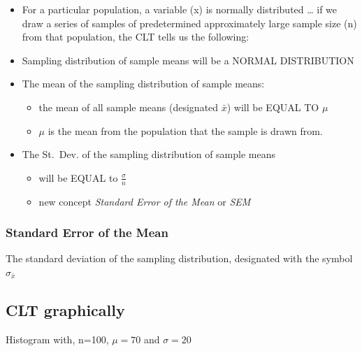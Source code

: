 \documentclass[]{article}
\begin{document}
\begin{itemize}
\item
  For a particular population, a variable (x) is normally distributed
  \ldots{} if we draw a series of samples of predetermined approximately
  large sample size (n) from that population, the CLT tells us the
  following:
\item
  Sampling distribution of sample means will be a NORMAL DISTRIBUTION
\item
  The mean of the sampling distribution of sample means:

  \begin{itemize}
  \itemsep1pt\parskip0pt
  \item
    the mean of all sample means (designated $\bar{x}$) will be EQUAL TO
    $\mu$
  \item
    $\mu$ is the mean from the population that the sample is drawn from.
  \end{itemize}
\item
  The St.~Dev. of the sampling distribution of sample means

  \begin{itemize}
  \itemsep1pt\parskip0pt
  \item
    will be EQUAL to $\frac{\sigma}{n}$
  \item
    new concept \emph{Standard Error of the Mean} or \emph{SEM}
  \end{itemize}
\end{itemize}

\subsubsection{Standard Error of the
Mean}\label{standard-error-of-the-mean}

The standard deviation of the sampling distribution, designated with the
symbol $\sigma_{\bar{x}}$

\subsection{CLT graphically}\label{clt-graphically}

Histogram with, n=100, $\mu=70$ and $\sigma=20$
\end{document}

